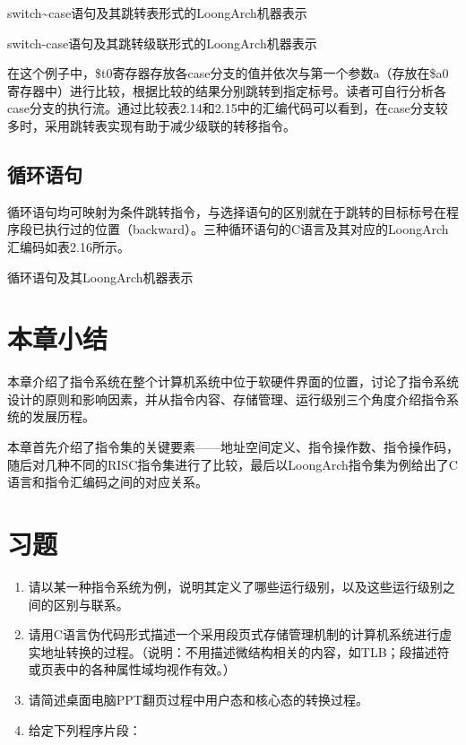 \documentclass[]{ctexbook}
\begin{document}
\label{tab:switch-case}switch\textasciitilde case语句及其跳转表形式的LoongArch机器表示

\label{tab:switch-case-chain}switch-case语句及其跳转级联形式的LoongArch机器表示

在这个例子中，\$t0寄存器存放各case分支的值并依次与第一个参数a（存放在\$a0寄存器中）进行比较，根据比较的结果分别跳转到指定标号。读者可自行分析各case分支的执行流。通过比较表2.14和2.15中的汇编代码可以看到，在case分支较多时，采用跳转表实现有助于减少级联的转移指令。

\hypertarget{ux5faaux73afux8bedux53e5}{%
\subsection{循环语句}\label{ux5faaux73afux8bedux53e5}}

循环语句均可映射为条件跳转指令，与选择语句的区别就在于跳转的目标标号在程序段已执行过的位置（backward）。三种循环语句的C语言及其对应的LoongArch汇编码如表2.16所示。

\label{tab:loop}循环语句及其LoongArch机器表示

\hypertarget{ux672cux7ae0ux5c0fux7ed3-1}{%
\section{本章小结}\label{ux672cux7ae0ux5c0fux7ed3-1}}

本章介绍了指令系统在整个计算机系统中位于软硬件界面的位置，讨论了指令系统设计的原则和影响因素，并从指令内容、存储管理、运行级别三个角度介绍指令系统的发展历程。

本章首先介绍了指令集的关键要素------地址空间定义、指令操作数、指令操作码，随后对几种不同的RISC指令集进行了比较，最后以LoongArch指令集为例给出了C语言和指令汇编码之间的对应关系。

\hypertarget{ux4e60ux9898-1}{%
\section{习题}\label{ux4e60ux9898-1}}

\begin{enumerate}
\def\labelenumi{\arabic{enumi}.}
\item
  请以某一种指令系统为例，说明其定义了哪些运行级别，以及这些运行级别之间的区别与联系。
\item
  请用C语言伪代码形式描述一个采用段页式存储管理机制的计算机系统进行虚实地址转换的过程。（说明：不用描述微结构相关的内容，如TLB；段描述符或页表中的各种属性域均视作有效。）
\item
  请简述桌面电脑PPT翻页过程中用户态和核心态的转换过程。
\item
  给定下列程序片段：
\end{enumerate}
\end{document}
